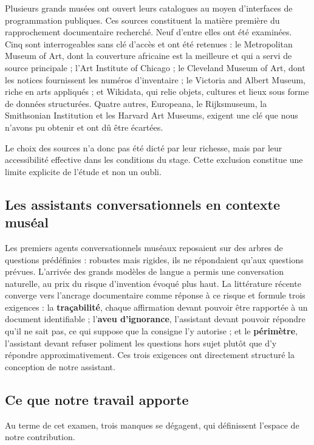 Plusieurs grands musées ont ouvert leurs catalogues au moyen d'interfaces de
programmation publiques. Ces sources constituent la matière première du
rapprochement documentaire recherché. Neuf d'entre elles ont été examinées.
Cinq sont interrogeables sans clé d'accès et ont été retenues : le Metropolitan
Museum of Art, dont la couverture africaine est la meilleure et qui a servi de
source principale ; l'Art Institute of Chicago ; le Cleveland Museum of Art,
dont les notices fournissent les numéros d'inventaire ; le Victoria and Albert
Museum, riche en arts appliqués ; et Wikidata, qui relie objets, cultures et
lieux sous forme de données structurées. Quatre autres, Europeana, le
Rijksmuseum, la Smithsonian Institution et les Harvard Art Museums, exigent une
clé que nous n'avons pu obtenir et ont dû être écartées.

Le choix des sources n'a donc pas été dicté par leur richesse, mais par leur
accessibilité effective dans les conditions du stage. Cette exclusion constitue
une limite explicite de l'étude et non un oubli.

\subsection{Les assistants conversationnels en contexte muséal}

Les premiers agents conversationnels muséaux reposaient sur des arbres de
questions prédéfinies : robustes mais rigides, ils ne répondaient qu'aux
questions prévues. L'arrivée des grands modèles de langue a permis une
conversation naturelle, au prix du risque d'invention évoqué plus haut. La
littérature récente converge vers l'ancrage documentaire comme réponse à ce
risque et formule trois exigences : la \textbf{traçabilité}, chaque affirmation
devant pouvoir être rapportée à un document identifiable ; l'\textbf{aveu
d'ignorance}, l'assistant devant pouvoir répondre qu'il ne sait pas, ce qui
suppose que la consigne l'y autorise ; et le \textbf{périmètre}, l'assistant
devant refuser poliment les questions hors sujet plutôt que d'y répondre
approximativement. Ces trois exigences ont directement structuré la conception
de notre assistant.

\subsection{Ce que notre travail apporte}

Au terme de cet examen, trois manques se dégagent, qui définissent l'espace de
notre contribution.

